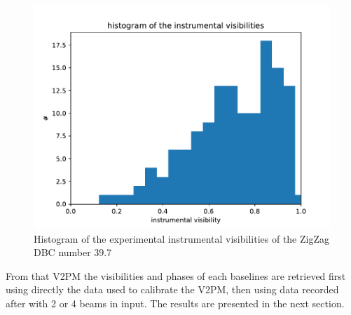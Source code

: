 \begin{figure}[htbp!]
 \centering
 \includegraphics[scale=.5]{../picture/hist.pdf}
 \caption{Histogram of the experimental instrumental visibilities of the ZigZag DBC number 39.7}
 \label{fig:hist}
\end{figure}


From that V2PM the visibilities and phases of each baselines are retrieved first using directly the data used to calibrate the V2PM, then using data recorded after with 2 or 4 beams in input. The results are presented in the next section. 


